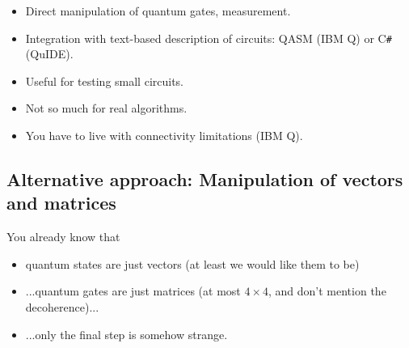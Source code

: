 \documentclass{beamer}
\begin{document}
\begin{frame}{\insertsection}{\insertsubsection}
    \begin{itemize}
        \item<1-> Direct manipulation of quantum gates, measurement.
        \item<2-> Integration with text-based description of circuits: QASM 
        (IBM Q) or C\texttt{\#} (QuIDE).
        \item<3-> Useful for testing small circuits.
        \item<4-> Not so much for real algorithms.
        \item<5-> You have to live with connectivity limitations (IBM Q).
    \end{itemize}
\end{frame}   
    

\subsection{Alternative approach: Manipulation of vectors and matrices}

\begin{frame}{\insertsection}{\insertsubsection}
    You already know that
    \begin{itemize}
        \item<1-> quantum states are just vectors (at least we would like them 
        to 
        be)
        \item<2-> ...quantum gates are just matrices (at most $4\times 4$, and 
        don't mention the decoherence)...
        \item<3-> ...only the final step is somehow strange.
    \end{itemize}

\end{frame}


\end{document}
